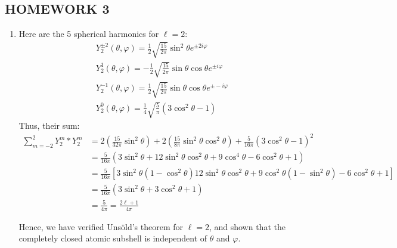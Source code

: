 \documentclass[10pt]{article}
\begin{document}

\begin{centering}
  \section*{HOMEWORK 3}
\end{centering}

\begin{enumerate}
  \item
  Here are the 5 spherical harmonics for $ \ell=2 $:
  \begin{gather*}
  Y_{2}^{\pm 2} \left( \theta, \varphi \right) = \frac{1}{2} \sqrt{\frac{15}{2\pi}} \sin ^2 \theta e ^ {\pm 2i \varphi} \\
  Y_{2}^{1} \left( \theta, \varphi \right) = -\frac{1}{2} \sqrt{\frac{15}{2\pi}} \sin \theta \cos \theta e ^ {\pm i \varphi} \\
  Y_{2}^{-1} \left( \theta, \varphi \right) = \frac{1}{2} \sqrt{\frac{15}{2\pi}} \sin \theta \cos \theta e ^ {\pm -i \varphi} \\
  Y_{2}^{0} \left( \theta, \varphi \right) = \frac{1}{4} \sqrt{\frac{5}{\pi}} \left( 3 \cos ^2 \theta - 1 \right)
  \end{gather*}
  Thus, their sum:
  \begin{align*}
    \sum_{m=-2}^{2} Y_{2}^{m}*Y_{2}^{m} &= 2 \left( \frac{15}{32\pi} \sin^2\theta \right) + 2 \left( \frac{15}{8\pi} \sin^2\theta \cos^2\theta \right) + \frac{5}{16\pi} \left( 3 \cos^2\theta - 1 \right) ^2 \\
    &= \frac{5}{16\pi} \left( 3\sin^2\theta + 12 \sin ^2 \theta \cos ^2 \theta + 9 \cos ^{4} \theta - 6 \cos ^2 \theta + 1 \right) \\
    &= \frac{5}{16\pi} \left[ 3 \sin ^2 \theta \left( 1- \cos^2\theta \right) 12 \sin^2 \theta \cos^2 \theta + 9 \cos ^2 \theta \left(  1- \sin ^2 \theta \right) - 6 \cos^2 \theta + 1 \right] \\
    &= \frac{5}{16\pi} \left( 3 \sin ^2 \theta + 3 \cos ^2 \theta + 1 \right) \\
    &= \frac{5}{4\pi} = \frac{2 \ell + 1}{4\pi}
  \end{align*}

  Hence, we have verified Uns{\"o}ld's theorem for $ \ell = 2 $, and shown that the completely closed atomic subshell is independent of $ \theta $ and $ \varphi $.
  

\end{enumerate}
\end{document}
